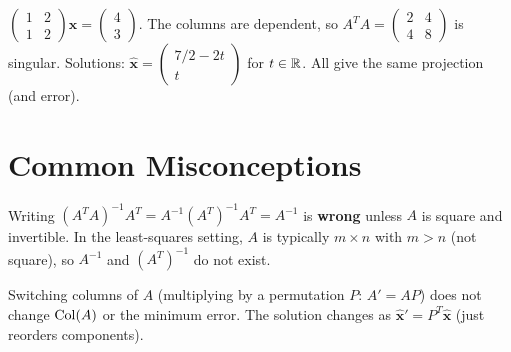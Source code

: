\begin{example}
$\begin{pmatrix}1&2\\1&2\end{pmatrix}\mathbf{x}=\begin{pmatrix}4\\3\end{pmatrix}$. The columns are dependent, so $A^TA=\begin{pmatrix}2&4\\4&8\end{pmatrix}$ is singular. Solutions: $\hat{\mathbf{x}}=\begin{pmatrix}7/2-2t\\t\end{pmatrix}$ for $t\in\mathbb{R}$. All give the same projection (and error).
\end{example}

\section{Common Misconceptions}

\begin{remark}
Writing $(A^TA)^{-1}A^T = A^{-1}(A^T)^{-1}A^T = A^{-1}$ is \textbf{wrong} unless $A$ is square and invertible. In the least-squares setting, $A$ is typically $m\times n$ with $m>n$ (not square), so $A^{-1}$ and $(A^T)^{-1}$ do not exist.
\end{remark}

\begin{remark}
Switching columns of $A$ (multiplying by a permutation $P$: $A'=AP$) does not change $\operatorname{Col}(A)$ or the minimum error. The solution changes as $\hat{\mathbf{x}}' = P^T\hat{\mathbf{x}}$ (just reorders components).
\end{remark}
